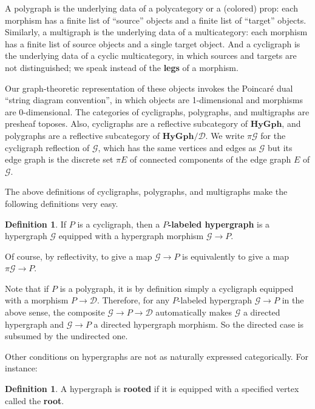 \documentclass{article}
\theoremstyle{definition}
\newtheorem{defn}[thm]{Definition}
\theoremstyle{remark}
\def\G{\mathcal{G}}
\def\hy{\mathbf{HyGph}}
\def\dhy{\mathcal{D}}
\begin{document}
A polygraph is the underlying data of a polycategory or a (colored) prop: each morphism has a finite list of ``source'' objects and a finite list of ``target'' objects.
Similarly, a multigraph is the underlying data of a multicategory: each morphism has a finite list of source objects and a single target object.
And a cycligraph is the underlying data of a cyclic multicategory, in which sources and targets are not distinguished; we speak instead of the \textbf{legs} of a morphism.

Our graph-theoretic representation of these objects invokes the Poincar\'e dual ``string diagram convention'', in which objects are 1-dimensional and morphisms are 0-dimensional.
The categories of cycligraphs, polygraphs, and multigraphs are presheaf toposes.
Also, cycligraphs are a reflective subcategory of $\hy$, and polygraphs are a reflective subcategory of $\hy/\dhy$.
We write $\pi \G$ for the cycligraph reflection of $\G$, which has the same vertices and edges as $\G$ but its edge graph is the discrete set $\pi E$ of connected components of the edge graph $E$ of $\G$.

The above definitions of cycligraphs, polygraphs, and multigraphs make the following definitions very easy.

\begin{defn}\label{thm:labeled}
  If $P$ is a cycligraph, then a \textbf{$P$-labeled hypergraph} is a hypergraph $\G$ equipped with a hypergraph morphism $\G\to P$.
\end{defn}

Of course, by reflectivity, to give a map $\G\to P$ is equivalently to give a map $\pi \G \to P$.

Note that if $P$ is a polygraph, it is by definition simply a cycligraph equipped with a morphism $P\to \dhy$.
Therefore, for any $P$-labeled hypergraph $\G\to P$ in the above sense, the composite $\G\to P\to\dhy$ automatically makes $\G$ a directed hypergraph and $\G\to P$ a directed hypergraph morphism.
So the directed case is subsumed by the undirected one.

Other conditions on hypergraphs are not as naturally expressed categorically.
For instance:

\begin{defn}
  A hypergraph is \textbf{rooted} if it is equipped with a specified vertex called the \textbf{root}.
\end{defn}
\end{document}
